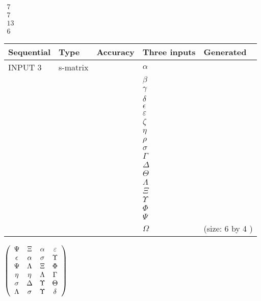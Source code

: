 \documentclass[12pt]{article}
\begin{document}
   
 $\begin{array}{
 c
 }
           7  \\ 
           7  \\ 
          13  \\ 
           6
\end{array}  $ 
  
  
\noindent\begin{tabular}{|l|l|l|l|l|}
\hline
 Sequential & Type & Accuracy & Three inputs & Generated \\ 
\hline
 
 
  INPUT $            3 $ & s-matrix & & 
 $  \alpha $ & 
  \\
  & & & 
 $  \beta $ & 
  \\
  & & & 
 $  \gamma $ & 
  \\
  & & & 
 $  \delta $ & 
  \\
  & & & 
 $  \epsilon $ & 
  \\
  & & & 
 $  \varepsilon $ & 
  \\
  & & & 
 $                     \zeta $ & 
  \\
  & & & 
 $  \eta $ & 
  \\
  & & & 
 $  \rho $ & 
  \\
  & & & 
 $  \sigma $ & 
  \\
  & & & 
 $  \Gamma $ & 
  \\
  & & & 
 $  \Delta $ & 
  \\
  & & & 
 $  \Theta $ & 
  \\
  & & & 
 $  \Lambda $ & 
  \\
  & & & 
 $                     \Xi $ & 
  \\
  & & & 
 $  \Upsilon $ & 
  \\
  & & & 
 $  \Phi $ & 
  \\
  & & & 
 $  \Psi $ & 
  \\
  & & & 
 $  \Omega $ & 
  (size:            6  by            4 )
 \\  \hline  
 \end{tabular}
   
   
 $  \left( \begin{array}
 {
 c
 c
 c
 c
 }
 \Psi & 
                    \Xi & 
 \alpha & 
 \varepsilon \\ 
 \epsilon & 
 \alpha & 
 \sigma & 
 \Upsilon \\ 
 \Psi & 
 \Lambda & 
                    \Xi & 
 \Phi \\ 
 \eta & 
 \eta & 
 \Lambda & 
 \Gamma \\ 
 \sigma & 
 \Delta & 
 \Upsilon & 
 \Theta \\ 
 \Lambda & 
 \sigma & 
 \Upsilon & 
 \delta
 \end{array} \right) $ 
  
\end{document}
